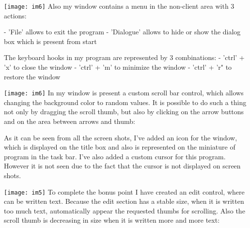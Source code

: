 \texttt{[image: im6]}
Also my window contains a menu in the non-client area with 3 actions: 

- 'File' allows to exit the program
- 'Dialogue' allows to hide or show the dialog box which is present from start



The keyboard hooks in my program are represented by 3 combinations:
- 'ctrl' + 'x' to close the window
- 'ctrl' + 'm' to minimize the window
- 'ctrl' + 'r" to restore the window



\texttt{[image: im6]}
In my window is present a custom scroll bar control, which allows changing the background color to random values. It is possible to do such a thing not only by dragging the scroll thumb, but also by clicking on the arrow buttons and on the area between arrows and thumb:


As it can be seen from all the screen shots, I've added an icon for the window, which is displayed on the title box and also is represented on the miniature of program in the task bar.
I've also added a custom cursor for this program. However it is not seen due to the fact that the cursor is not displayed on screen shots.



\texttt{[image: im5]}
To complete the bonus point I have created an edit control, where can be written text. Because the edit section has a stable size, when it is written too much text, automatically appear the requested thumbs for scrolling. Also the scroll thumb is decreasing in size when it is written more and more text:

\clearpage